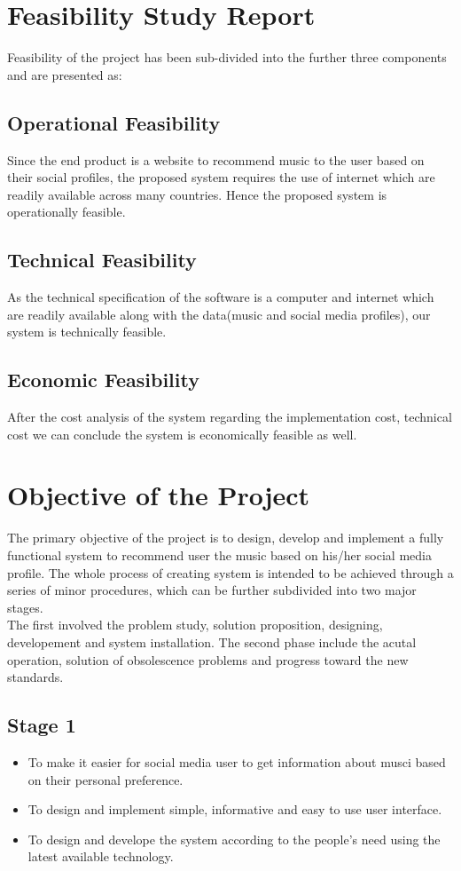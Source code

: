 \documentclass{article}
\begin{document}
\section{Feasibility Study Report}
	Feasibility of the project has been sub-divided into the further three components and are presented as:\\
	\subsection{Operational Feasibility}
	Since the end product is a website to recommend music to the user based on their social profiles, the proposed system requires the use of internet which are readily available across many countries. Hence the proposed system is operationally feasible.
	\subsection{Technical Feasibility}
	As the technical specification of the software is a computer and internet which are readily available along with the data(music and social media profiles), our system is technically feasible.
	\subsection{Economic Feasibility}
	After the cost analysis of the system regarding the implementation cost, technical cost we can conclude the system is economically feasible as well.
\cleardoublepage

\section{Objective of the Project}
The primary objective of the project is to design, develop and implement a fully functional system to recommend user the music based on his/her social media profile. The whole process of creating system is intended to be achieved through a series of minor procedures, which can be further subdivided into two major stages.\\
The first involved the problem study, solution proposition, designing, developement and system installation. The second phase include the acutal operation, solution of obsolescence problems and progress toward the new standards.\subsection{Stage 1}
\begin{itemize}
	\item To make it easier for social media user to get information about musci based on their personal preference.
	\item To design and implement simple, informative and easy to use user interface.
	\item To design and develope the system according to the people's need using the latest available technology.
\end{itemize}
\end{document}
